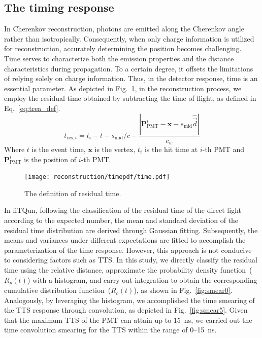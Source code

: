 \subsection{The timing response}
In Cherenkov reconstruction, photons are emitted along the Cherenkov angle rather than isotropically. Consequently, when only charge information is utilized for reconstruction, accurately determining the position becomes challenging. Time serves to characterize both the emission properties and the distance characteristics during propagation. To a certain degree, it offsets the limitations of relying solely on charge information. Thus, in the detector response, time is an essential parameter. As depicted in Fig.~\ref{fig:tres_define}, in the reconstruction process, we employ the residual time obtained by subtracting the time of flight, as defined in Eq.~\eqref{eq:trea_def}.
\begin{equation}
	t_{\mathrm{res},i} = t_i - t - s_{\mathrm{mid}}/c - \frac{|\boldsymbol{P}_{\mathrm{PMT}}^i - \boldsymbol{x} - s_{\mathrm{mid}}\widehat{\overrightarrow{d} } |}{c_w}
	\label{eq:trea_def}
\end{equation}
Where $t$ is the event time, $\boldsymbol{x}$ is the vertex, $t_i$ is the hit time at $i$-th PMT and $\boldsymbol{P}_{\mathrm{PMT}}^i$ is the position of $i$-th PMT.
\begin{figure}
	\begin{center}
		\texttt{[image: reconstruction/timepdf/time.pdf]}
	\end{center}
	\caption{The definition of residual time.}
	\label{fig:tres_define}
\end{figure}
In fiTQun, following the classification of the residual time of the direct light according to the expected number, the mean and standard deviation of the residual time distribution are derived through Gaussian fitting. Subsequently, the means and variances under different expectations are fitted to accomplish the parameterization of the time response. However, this approach is not conducive to considering factors such as TTS. In this study, we directly classify the residual time using the relative distance, approximate the probability density function~($R_p(t)$) with a histogram, and carry out integration to obtain the corresponding cumulative distribution function~($R_c(t)$), as shown in Fig.~\ref{fig:smear0}. Analogously, by leveraging the histogram, we accomplished the time smearing of the TTS response through convolution, as depicted in Fig.~\ref{fig:smear5}. Given that the maximum TTS of the PMT can attain up to \SI{15}{ns}, we carried out the time convolution smearing for the TTS within the range of 0--\SI{15}{ns}.

